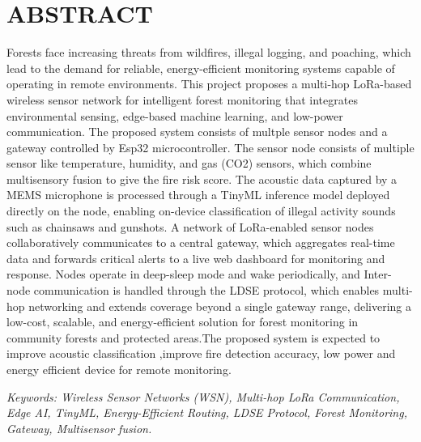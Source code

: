 \clearpage


\chapter*{\centering \textbf{ABSTRACT}}

Forests face increasing threats from wildfires, illegal logging, and poaching, which lead to the demand for reliable, energy-efficient monitoring systems capable of operating in remote environments. This project proposes a multi-hop LoRa-based wireless sensor network for intelligent forest monitoring that integrates environmental sensing, edge-based machine learning, and low-power communication. The proposed system consists of multple sensor nodes and a gateway controlled by Esp32 microcontroller. The sensor node consists of multiple sensor like temperature, humidity, and gas (CO2) sensors, which combine multisensory fusion to give the fire risk score. The acoustic data captured by a MEMS microphone is processed through a TinyML inference model deployed directly on the node, enabling on-device classification of illegal activity sounds such as chainsaws and gunshots. A network of LoRa-enabled sensor nodes collaboratively communicates to a central gateway, which aggregates real-time data and forwards critical alerts to a live web dashboard for monitoring and response. Nodes operate in deep-sleep mode and wake periodically, and Inter-node communication is handled through the LDSE protocol, which enables multi-hop networking and extends coverage beyond a single gateway range, delivering a low-cost, scalable, and energy-efficient solution for forest monitoring in community forests and protected areas.The proposed system is expected to improve acoustic classification ,improve fire detection accuracy, low power and energy efficient device for remote monitoring.


\vspace{0.5cm}
\textit{Keywords: Wireless Sensor Networks (WSN),  Multi-hop LoRa Communication, Edge AI, TinyML, Energy-Efficient Routing, LDSE Protocol, Forest Monitoring, Gateway, Multisensor fusion.}

\clearpage
